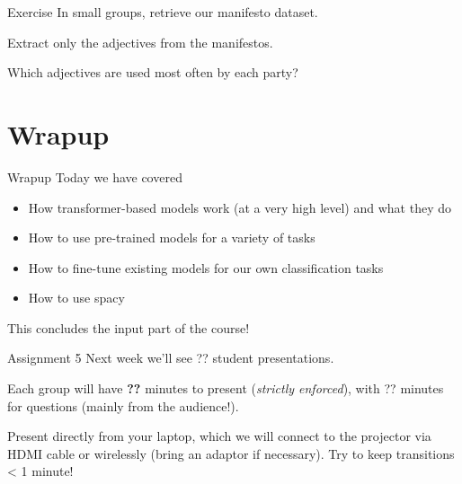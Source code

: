 \documentclass[
  10pt,
  ignorenonframetext,
  aspectratio=169]{beamer}
\newif\ifbibliography
\providecommand{\tightlist}{%
  \setlength{\itemsep}{0pt}\setlength{\parskip}{0pt}}
\begin{document}
\begin{frame}{Exercise}
\protect\hypertarget{exercise-1}{}
In small groups, retrieve our manifesto dataset.

Extract only the adjectives from the manifestos.

Which adjectives are used most often by each party?
\end{frame}

\hypertarget{wrapup}{%
\section{Wrapup}\label{wrapup}}

\begin{frame}{Wrapup}
\protect\hypertarget{wrapup-1}{}
Today we have covered

\begin{itemize}
\tightlist
\item
  How transformer-based models work (at a very high level) and what they
  do
\item
  How to use pre-trained models for a variety of tasks
\item
  How to fine-tune existing models for our own classification tasks
\item
  How to use spacy
\end{itemize}

This concludes the input part of the course!
\end{frame}

\begin{frame}{Assignment 5}
\protect\hypertarget{assignment-5}{}
Next week we'll see ?? student presentations.

Each group will have \textbf{??} minutes to present (\emph{strictly
enforced}), with ?? minutes for questions (mainly from the audience!).

Present directly from your laptop, which we will connect to the
projector via HDMI cable or wirelessly (bring an adaptor if necessary).
Try to keep transitions \textless{} 1 minute!
\end{frame}

\begin{frame}[allowframebreaks]{}
  \bibliographytrue
  
\end{frame}
\end{document}
